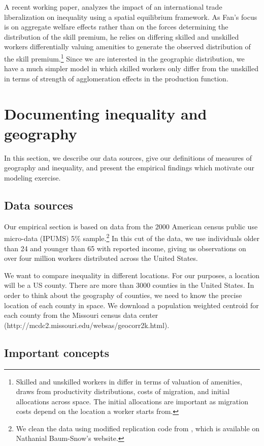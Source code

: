 \documentclass{article}
\begin{document}
A recent working paper, \citet{fan2015internal} analyzes the impact of an international trade liberalization on inequality using a spatial equilibrium framework.  As Fan's focus is on aggregate welfare effects rather than on the forces determining the distribution of the skill premium, he relies on differing skilled and unskilled workers differentially valuing amenities to generate the observed distribution of the skill premium.\footnote{Skilled and unskilled workers in \citet{fan2015internal} differ in terms of valuation of amenities, draws from productivity distributions, costs of migration, and initial allocations across space.  The initial allocations are important as migration costs depend on the location a worker starts from.}  Since we are interested in the geographic distribution, we have a much simpler model in which skilled workers only differ from the unskilled in terms of strength of agglomeration effects in the production function.
\section{Documenting inequality and geography}

In this section, we describe our data sources, give our definitions of measures of geography and inequality, and present the empirical findings which motivate our modeling exercise.  
\subsection{Data sources}

Our empirical section is based on data from the 2000 American census public use micro-data (IPUMS) 5\% sample.\footnote{We clean the data using modified replication code from \citet{baum2013inequality}, which is available on Nathanial Baum-Snow's website.}  In this cut of the data, we use individuals older than 24 and younger than 65 with reported income, giving us observations on over four million workers distributed across the United States.

We want to compare inequality in different locations.  For our purposes, a location will be a US county.  There are more than 3000 counties in the United States.  In order to think about the geography of counties, we need to know the precise location of each county in space.  We download a population weighted centroid for each county from the Missouri census data center (http://mcdc2.missouri.edu/websas/geocorr2k.html).


\subsection{Important concepts}
\end{document}
